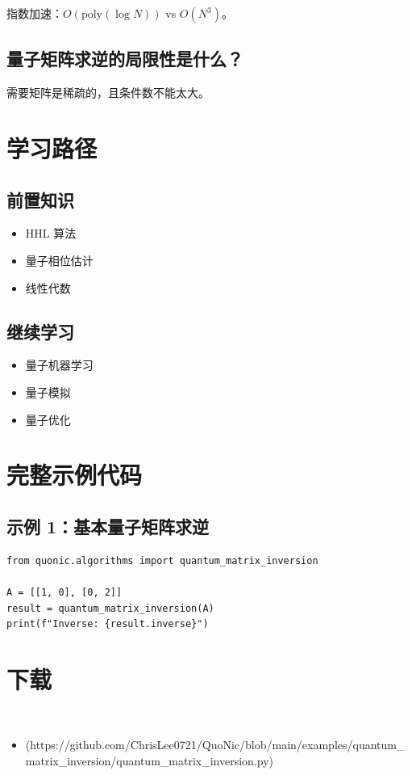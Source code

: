 \documentclass[12pt,a4paper]{article}
\begin{document}
指数加速：$O(\text{poly}(\log N))$ vs $O(N^3)$。

\subsection{量子矩阵求逆的局限性是什么？}

需要矩阵是稀疏的，且条件数不能太大。

\section{学习路径}

\subsection{前置知识}
\begin{itemize}
  \item HHL 算法
  \item 量子相位估计
  \item 线性代数
\end{itemize}

\subsection{继续学习}
\begin{itemize}
  \item 量子机器学习
  \item 量子模拟
  \item 量子优化
\end{itemize}

\section{完整示例代码}

\subsection{示例 1：基本量子矩阵求逆}

\begin{lstlisting}[style=python]
from quonic.algorithms import quantum_matrix_inversion

A = [[1, 0], [0, 2]]
result = quantum_matrix_inversion(A)
print(f"Inverse: {result.inverse}")
\end{lstlisting}


\section{下载}

\begin{itemize}
  \item [quantum_matrix_inversion.py](https://github.com/ChrisLee0721/QuoNic/blob/main/examples/quantum_matrix_inversion/quantum_matrix_inversion.py)
\end{itemize}
\end{document}
